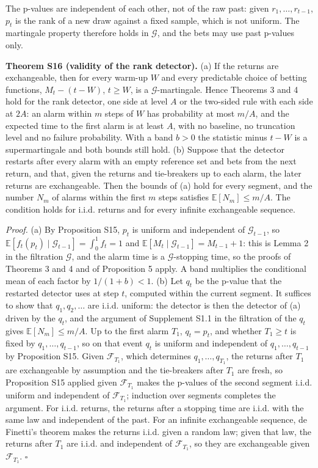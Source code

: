 \documentclass[
]{article}
\begin{document}
The p-values are independent of each other, not of the raw past: given
\(r_1, \dots, r_{t-1}\), \(p_t\) is the rank of a new draw against a
fixed sample, which is not uniform. The martingale property therefore
holds in \(\mathcal{G}\), and the bets may use past p-values only.

\textbf{Theorem S16 (validity of the rank detector).} (a) If the returns
are exchangeable, then for every warm-up \(W\) and every predictable
choice of betting functions, \(M_t - (t - W)\), \(t \ge W\), is a
\(\mathcal{G}\)-martingale. Hence Theorems 3 and 4 hold for the rank
detector, one side at level \(A\) or the two-sided rule with each side
at \(2A\): an alarm within \(m\) steps of \(W\) has probability at most
\(m/A\), and the expected time to the first alarm is at least \(A\),
with no baseline, no truncation level and no failure probability. With a
band \(b > 0\) the statistic minus \(t - W\) is a supermartingale and
both bounds still hold. (b) Suppose that the detector restarts after
every alarm with an empty reference set and bets from the next return,
and that, given the returns and tie-breakers up to each alarm, the later
returns are exchangeable. Then the bounds of (a) hold for every segment,
and the number \(N_m\) of alarms within the first \(m\) steps satisfies
\(\mathbb{E}[N_m] \le m/A\). The condition holds for i.i.d. returns and
for every infinite exchangeable sequence.

\emph{Proof.} (a) By Proposition S15, \(p_t\) is uniform and independent
of \(\mathcal{G}_{t-1}\), so
\(\mathbb{E}[f_t(p_t) \mid \mathcal{G}_{t-1}] = \int_0^1 f_t = 1\) and
\(\mathbb{E}[M_t \mid \mathcal{G}_{t-1}] = M_{t-1} + 1\): this is Lemma
2 in the filtration \(\mathcal{G}\), and the alarm time is a
\(\mathcal{G}\)-stopping time, so the proofs of Theorems 3 and 4 and of
Proposition 5 apply. A band multiplies the conditional mean of each
factor by \(1/(1 + b) < 1\). (b) Let \(q_t\) be the p-value that the
restarted detector uses at step \(t\), computed within the current
segment. It suffices to show that \(q_1, q_2, \dots\) are i.i.d.
uniform: the detector is then the detector of (a) driven by the \(q_t\),
and the argument of Supplement S1.1 in the filtration of the \(q_t\)
gives \(\mathbb{E}[N_m] \le m/A\). Up to the first alarm \(T_1\),
\(q_t = p_t\), and whether \(T_1 \ge t\) is fixed by
\(q_1, \dots, q_{t-1}\), so on that event \(q_t\) is uniform and
independent of \(q_1, \dots, q_{t-1}\) by Proposition S15. Given
\(\mathcal{F}_{T_1}\), which determines \(q_1, \dots, q_{T_1}\), the
returns after \(T_1\) are exchangeable by assumption and the
tie-breakers after \(T_1\) are fresh, so Proposition S15 applied given
\(\mathcal{F}_{T_1}\) makes the p-values of the second segment i.i.d.
uniform and independent of \(\mathcal{F}_{T_1}\); induction over
segments completes the argument. For i.i.d. returns, the returns after a
stopping time are i.i.d. with the same law and independent of the past.
For an infinite exchangeable sequence, de Finetti's theorem makes the
returns i.i.d. given a random law; given that law, the returns after
\(T_1\) are i.i.d. and independent of \(\mathcal{F}_{T_1}\), so they are
exchangeable given \(\mathcal{F}_{T_1}\). \(\square\)
\end{document}
